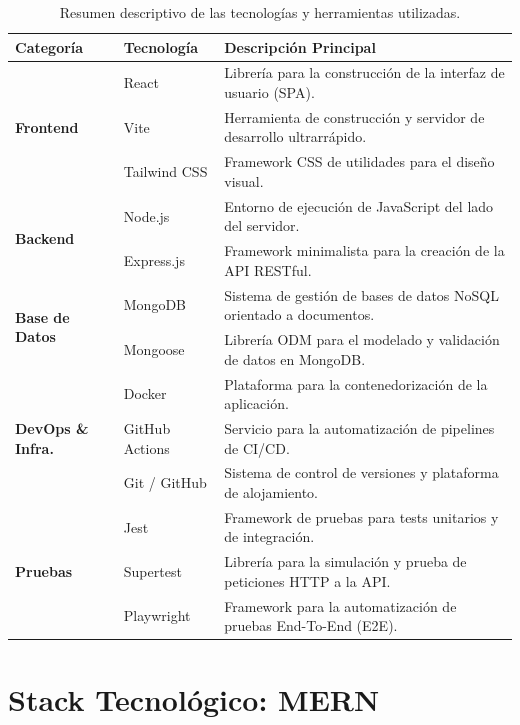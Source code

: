 \begin{table}[hbt!]
\centering
\renewcommand{\arraystretch}{1.3}
\begin{tabular}{|l|l|p{9cm}|}
\hline
\textbf{Categoría} & \textbf{Tecnología} & \textbf{Descripción Principal} \\ \hline
\multirow{3}{*}{\textbf{Frontend}} & React & Librería para la construcción de la interfaz de usuario (SPA). \\ \cline{2-3} 
 & Vite & Herramienta de construcción y servidor de desarrollo ultrarrápido. \\ \cline{2-3} 
 & Tailwind CSS & Framework CSS de utilidades para el diseño visual. \\ \hline
\multirow{2}{*}{\textbf{Backend}} & Node.js & Entorno de ejecución de JavaScript del lado del servidor. \\ \cline{2-3} 
 & Express.js & Framework minimalista para la creación de la API RESTful. \\ \hline
\multirow{2}{*}{\textbf{Base de Datos}} & MongoDB & Sistema de gestión de bases de datos NoSQL orientado a documentos. \\ \cline{2-3} 
 & Mongoose & Librería ODM para el modelado y validación de datos en MongoDB. \\ \hline
\multirow{3}{*}{\textbf{DevOps \& Infra.}} & Docker & Plataforma para la contenedorización de la aplicación. \\ \cline{2-3} 
 & GitHub Actions & Servicio para la automatización de pipelines de CI/CD. \\ \cline{2-3} 
 & Git / GitHub & Sistema de control de versiones y plataforma de alojamiento. \\ \hline
\multirow{3}{*}{\textbf{Pruebas}} & Jest & Framework de pruebas para tests unitarios y de integración. \\ \cline{2-3} 
 & Supertest & Librería para la simulación y prueba de peticiones HTTP a la API. \\ \cline{2-3} 
 & Playwright & Framework para la automatización de pruebas End-To-End (E2E). \\ \hline
\end{tabular}
\caption{Resumen descriptivo de las tecnologías y herramientas utilizadas.}
\label{tab:resumen_tecnologias}
\end{table}

\section{Stack Tecnológico: MERN}
\label{sec:stackMERN}

